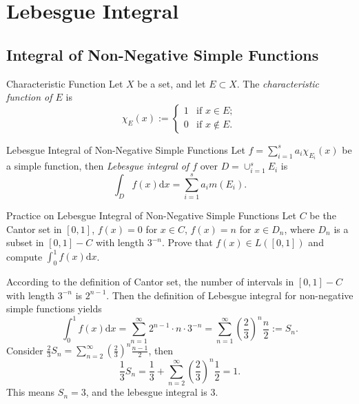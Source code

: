

\section{Lebesgue Integral}

\subsection{Integral of Non-Negative Simple Functions}

\begin{definition}{Characteristic Function}{}
  Let $X$ be a set, and let $E \subset X$.
  The \emph{characteristic function of $E$} is
  \begin{equation}
    \chi_E(x) :=
    \begin{cases}
      1 & \text{if } x \in E;\\
      0 & \text{if } x \not \in E.
    \end{cases}
  \end{equation}
\end{definition}

\begin{definition}{Lebesgue Integral of Non-Negative Simple Functions}{}
  Let $f = \sum _{i = 1}^s a_i \chi_{E_i}(x)$ be a simple function,
  then \emph{Lebesgue integral of $f$} over $D = \cup _{i = 1}^s E_i$ is
  \begin{equation}
    \int_D f(x)\mathrm{d} x = \sum\limits_{i = 1}^s a_i m(E_i).
  \end{equation}
\end{definition}

\begin{example}{Practice on Lebesgue Integral of Non-Negative Simple Functions}{}
  Let $C$ be the Cantor set in $[0, 1]$,
  $f(x) = 0$ for $x \in C$, $f(x) = n$ for $x \in D_n$,
  where $D_n$ is a subset in $[0, 1] - C$ with length $3^{-n}$.
  Prove that $f(x) \in L([0, 1])$ and compute $\int_0^1 f(x)\mathrm{d} x$.
\end{example}

\begin{solution}
  According to the definition of Cantor set,
  the number of intervals in $[0, 1] - C$ with length $3^{-n}$ is $2^{n-1}$.
  Then the definition of Lebesgue integral for non-negative simple functions yields
  \begin{equation}
    \int_0^1 f(x)\mathrm{d} x
    = \sum\limits_{n = 1}^{\infty} 2^{n-1} \cdot n \cdot 3^{-n}
    = \sum\limits_{n = 1}^{\infty} \left( \frac{2}{3} \right)^n \frac{n}{2}
    := S_n.
  \end{equation}
  Consider $\frac{2}{3}S_n = \sum\limits_{n = 2}^{\infty} (\frac{2}{3})^n
  \frac{n-1}{2}$, then
  \begin{equation}
    \frac{1}{3}S_n = \frac{1}{3} + \sum\limits_{n = 2}^{\infty} \left( \frac{2}{3} \right)^n \frac{1}{2}
    = 1.
  \end{equation}
  This means $S_n = 3$, and the lebesgue integral is $3$.
\end{solution}

